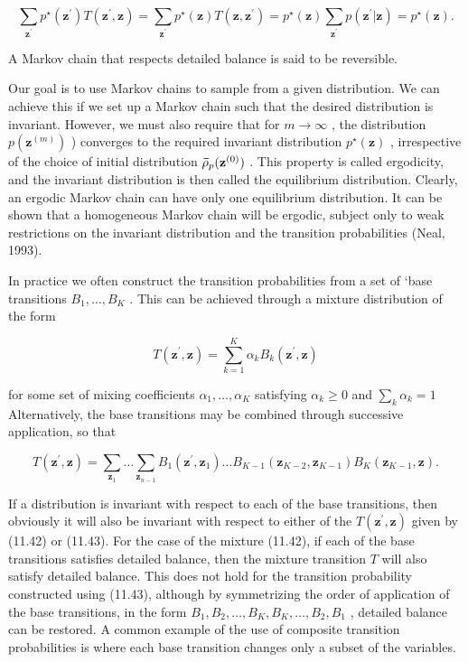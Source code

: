 \documentclass[
  10
]{article}
\begin{document}
\[
\sum_ {\mathbf {z} ^ {\prime}} p ^ {\star} (\mathbf {z} ^ {\prime}) T (\mathbf {z} ^ {\prime}, \mathbf {z}) = \sum_ {\mathbf {z} ^ {\prime}} p ^ {\star} (\mathbf {z}) T (\mathbf {z}, \mathbf {z} ^ {\prime}) = p ^ {\star} (\mathbf {z}) \sum_ {\mathbf {z} ^ {\prime}} p (\mathbf {z} ^ {\prime} | \mathbf {z}) = p ^ {\star} (\mathbf {z}).\tag{11.41}
\]

A Markov chain that respects detailed balance is said to be reversible.

Our goal is to use Markov chains to sample from a given distribution. We
can achieve this if we set up a Markov chain such that the desired
distribution is invariant. However, we must also require that for
\(m \to \infty\) , the distribution \(p ( \mathbf { z } ^ { ( m ) } )\)
) converges to the required invariant distribution
\(p ^ { \star } ( \mathbf { z } )\) , irrespective of the choice of
initial distribution
\({ \bf \bar { \rho } } _ { p } ( { \bf z } ^ { ( 0 ) } )\) . This
property is called ergodicity, and the invariant distribution is then
called the equilibrium distribution. Clearly, an ergodic Markov chain
can have only one equilibrium distribution. It can be shown that a
homogeneous Markov chain will be ergodic, subject only to weak
restrictions on the invariant distribution and the transition
probabilities (Neal, 1993).

In practice we often construct the transition probabilities from a set
of `base transitions \(B _ { 1 } , \ldots , B _ { K }\) . This can be
achieved through a mixture distribution of the form

\[
T (\mathbf {z} ^ {\prime}, \mathbf {z}) = \sum_ {k = 1} ^ {K} \alpha_ {k} B _ {k} (\mathbf {z} ^ {\prime}, \mathbf {z})\tag{11.42}
\]

for some set of mixing coefficients
\(\alpha _ { 1 } , \ldots , \alpha _ { K }\) satisfying
\(\alpha _ { k } \geqslant 0\) and
\(\textstyle \sum _ { k } \alpha _ { k } = 1\) Alternatively, the base
transitions may be combined through successive application, so that

\[
T (\mathbf {z} ^ {\prime}, \mathbf {z}) = \sum_ {\mathbf {z} _ {1}} \dots \sum_ {\mathbf {z} _ {n - 1}} B _ {1} (\mathbf {z} ^ {\prime}, \mathbf {z} _ {1}) \dots B _ {K - 1} (\mathbf {z} _ {K - 2}, \mathbf {z} _ {K - 1}) B _ {K} (\mathbf {z} _ {K - 1}, \mathbf {z}).\tag{11.43}
\]

If a distribution is invariant with respect to each of the base
transitions, then obviously it will also be invariant with respect to
either of the \(T ( \mathbf { z } ^ { \prime } , \mathbf { z } )\) given
by (11.42) or (11.43). For the case of the mixture (11.42), if each of
the base transitions satisfies detailed balance, then the mixture
transition \(T\) will also satisfy detailed balance. This does not hold
for the transition probability constructed using (11.43), although by
symmetrizing the order of application of the base transitions, in the
form
\(B _ { 1 } , B _ { 2 } , \ldots , B _ { K } , B _ { K } , \ldots , B _ { 2 } , B _ { 1 }\)
, detailed balance can be restored. A common example of the use of
composite transition probabilities is where each base transition changes
only a subset of the variables.
\end{document}
